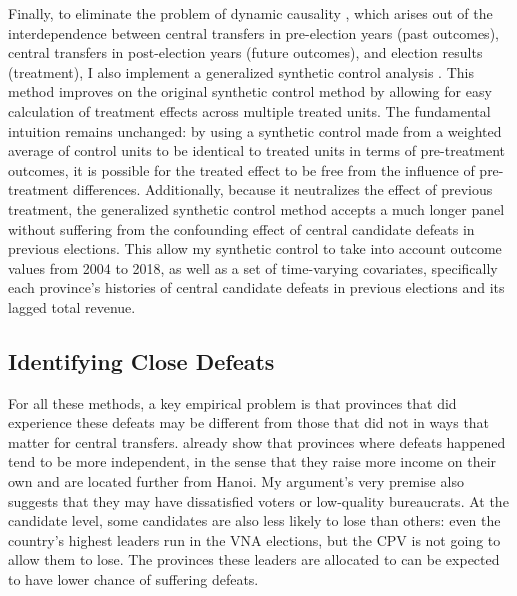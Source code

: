\documentclass[12pt]{article}
\newcommand{\1}{\mathbbm{1}}
\begin{document}
Finally, to eliminate the problem of dynamic causality \citep{ImaiKim2012}, which arises out of the interdependence between central transfers in pre-election years (past outcomes), central transfers in post-election years (future outcomes), and election results (treatment), I also implement a generalized synthetic control analysis \citep{Xu2017gsynth}. This method improves on the original synthetic control method \citep{Abadie2010} by allowing for easy calculation of treatment effects across multiple treated units. The fundamental intuition remains unchanged: by using a synthetic control made from a weighted average of control units to be identical to treated units in terms of pre-treatment outcomes, it is possible for the treated effect to be free from the influence of pre-treatment differences. Additionally, because it neutralizes the effect of previous treatment, the generalized synthetic control method accepts a much longer panel without suffering from the confounding effect of central candidate defeats in previous elections. This allow my synthetic control to take into account outcome values from 2004 to 2018, as well as a set of time-varying covariates, specifically each province's histories of central candidate defeats in previous elections and its lagged total revenue.

\subsection{Identifying Close Defeats}
\label{sec:methods_sample}

For all these methods, a key empirical problem is that provinces that did experience these defeats may be different from those that did not in ways that matter for central transfers. \citet{MaleskySchuler2011} already show that provinces where defeats happened tend to be more independent, in the sense that they raise more income on their own and are located further from Hanoi. My argument's very premise also suggests that they may have dissatisfied voters or low-quality bureaucrats. At the candidate level, some candidates are also less likely to lose than others: even the country's highest leaders run in the VNA elections, but the CPV is not going to allow them to lose. The provinces these leaders are allocated to can be expected to have lower chance of suffering defeats. 
\end{document}
